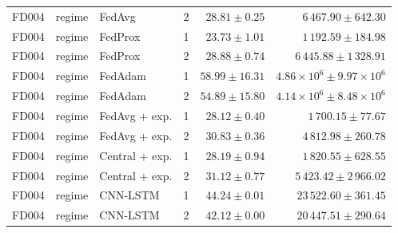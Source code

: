 \begin{tabular}{llllrr}
FD004 & regime & FedAvg & 2 & $28.81\pm0.25$ & $6\,467.90\pm642.30$ \\
FD004 & regime & FedProx & 1 & $23.73\pm1.01$ & $1\,192.59\pm184.98$ \\
FD004 & regime & FedProx & 2 & $28.88\pm0.74$ & $6\,445.88\pm1\,328.91$ \\
FD004 & regime & FedAdam & 1 & $58.99\pm16.31$ & $4.86\times10^{6}\pm9.97\times10^{6}$ \\
FD004 & regime & FedAdam & 2 & $54.89\pm15.80$ & $4.14\times10^{6}\pm8.48\times10^{6}$ \\
FD004 & regime & FedAvg + exp. & 1 & $28.12\pm0.40$ & $1\,700.15\pm77.67$ \\
FD004 & regime & FedAvg + exp. & 2 & $30.83\pm0.36$ & $4\,812.98\pm260.78$ \\
FD004 & regime & Central + exp. & 1 & $28.19\pm0.94$ & $1\,820.55\pm628.55$ \\
FD004 & regime & Central + exp. & 2 & $31.12\pm0.77$ & $5\,423.42\pm2\,966.02$ \\
FD004 & regime & CNN-LSTM & 1 & $44.24\pm0.01$ & $23\,522.60\pm361.45$ \\
FD004 & regime & CNN-LSTM & 2 & $42.12\pm0.00$ & $20\,447.51\pm290.64$ \\
\bottomrule
\end{tabular}
